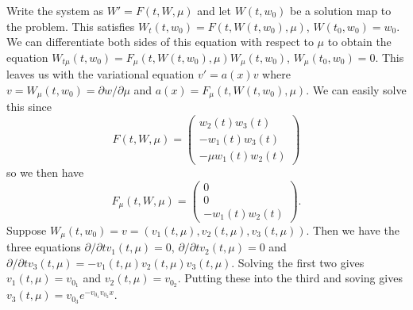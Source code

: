 \documentclass{article}
\begin{document}
Write the system as $W' = F(t,W,\mu)$ and let $W(t,w_0)$ be a solution map to the problem. This satisfies $W_t(t,w_0) = F(t,W(t,w_0),\mu)$, $W(t_0, w_0) = w_0$. We can differentiate both sides of this equation with respect to $\mu$ to obtain the equation $W_{t\mu}(t,w_0) = F_{\mu}(t,W(t,w_0),\mu) W_{\mu}(t,w_0)$, $W_{\mu}(t_0,w_0) = 0$. This leaves us with the variational equation $v' = a(x)v$ where $v = W_{\mu}(t,w_0) = \partial w/\partial \mu$ and $a(x) = F_{\mu}(t,W(t,w_0),\mu)$. We can easily solve this since
\[
F(t,W,\mu) = \left (
\begin{array}{c}
w_2(t)w_3(t)\\
-w_1(t)w_3(t)\\
-\mu w_1(t)w_2(t)
\end{array}
\right )
\]
so we then have
\[
F_{\mu}(t,W,\mu) = \left (
\begin{array}{c}
0\\
0\\
-w_1(t)w_2(t)
\end{array}
\right ).
\]
Suppose $W_{\mu}(t,w_0) = v = (v_1(t,\mu), v_2(t,\mu), v_3(t,\mu))$. Then we have the three equations $\partial/\partial t v_1(t,\mu) = 0$, $\partial/\partial t v_2(t,\mu) = 0$ and $\partial/\partial t v_3(t,\mu) = -v_1(t,\mu)v_2(t,\mu)v_3(t,\mu)$. Solving the first two gives $v_1(t,\mu) = v_{0_1}$ and $v_2(t,\mu) = v_{0_2}$. Putting these into the third and soving gives $v_3(t,\mu) = v_{0_3} e^{-v_{0_1} v_{0_2} x}$.
\end{document}
